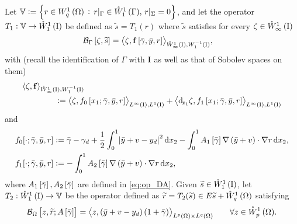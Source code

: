 \documentclass[final]{siamltex}
\begin{document}
Let ${\mathbb{V}} := \set{r \in {{W^{{1}}_{{q}}\del{{\Omega}}}}\,:\, r{\vert}_\Gamma \in {{\mathring{W}^{{1}}_{{1}}\del{{{\Gamma}}}}},\, r{\vert}_\Sigma = 0}$, 
and let the operator
$T_1:{\mathbb{V}} \to {{\mathring{W}^{1}_{1}\del{{\text{\rm I}}}}}$ be defined as ${\widetilde{s}} = T_1(r)$ where ${\widetilde{s}}$ satisfies for every $\zeta \in {{\mathring{W}^{1}_{\infty}\del{{\text{\rm I}}}}}$ 
\begin{align}\label{eq:t1_adj_var}
	{{\mathcal{B}}_\Gamma}\sbr{\zeta,{\widetilde{s}}} &= {\left\langle {\zeta, {\bf f}\sbr{{\bar{\gamma}},{\bar{y}},r}} \right\rangle}_{{{\mathring{W}^{{1}}_{{\infty}}\del{{\text{\rm I}}}}},
	{{W^{{-1}}_{{1}}\del{\text{\rm I}}}}},
\end{align}
with 
(recall the identification of $\Gamma$ with ${\text{\rm I}}$ as well as that 
of Sobolev spaces on them)
	\begin{align*}
	     &{\left\langle {\zeta,\bf f} \right\rangle}_{{{\mathring{W}^{1}_{\infty}\del{{\text{\rm I}}}}},{{W^{{-1}}_{{1}}\del{\text{\rm I}}}}} \\
	     &  \quad\quad\quad\quad := {\left\langle {\zeta, f_0\sbr{x_1;{\bar{\gamma}},{\bar{y}},r}} \right\rangle}_{{{L^\infty\del{{\text{\rm I}}}}}, {{L^1\del{\text{\rm I}}}}} 
				+ {\left\langle {{\operatorname{d}\!}_{x_1}\zeta,f_1\sbr{x_1;{\bar{\gamma}},{\bar{y}},r}} \right\rangle}_{{{L^\infty\del{{\text{\rm I}}}}},{{L^1\del{\text{\rm I}}}}}  
	\end{align*}			
and			
\begin{align}	
    	f_0[\cdot;{\bar{\gamma}}, {\bar{y}}, r] &:=  {\bar{\gamma}} - \gamma_d +
    	 \frac{1}{2}\int_0^1\abs{{\bar{y}}+v-y_d}^2 \dif x_2 
    	 - \int_0^1 A_1\sbr{\bar{\gamma}} {\nabla} \del{{\bar{y}}+v} \cdot {\nabla} r\dif x_2, \nonumber \\
    	f_1[\cdot;{\bar{\gamma}}, {\bar{y}}, r] &:=  - \int_0^1 A_2\sbr{\bar{\gamma}} {\nabla} \del{{\bar{y}}+v} \cdot {\nabla} r\dif x_2 	\label{eq:f0_f1_adj},
	\end{align}
where $A_1\sbr{\bar{\gamma}},A_2\sbr{\bar{\gamma}}$ are defined in \eqref{eq:op_DA}. 
Given ${\widetilde{s}} \in {{\mathring{W}^{1}_{1}\del{{\text{\rm I}}}}}$, let $T_2:{{\mathring{W}^{1}_{1}\del{{\text{\rm I}}}}} \to {\mathbb{V}}$ 
be the operator defined as 
${\widetilde{r}} = T_2({\widetilde{s}}) \in E {\widetilde{s}} + {{\mathring{W}^{1}_{q}\del{\Omega}}}$ satisfying
\begin{equation}\label{eq:t2_adj_var}
	{{\mathcal{B}}_\Omega}\sbr{z,{\widetilde{r}};A\sbr{\bar{\gamma}}} =  {{\mathop{{\left\langle {{z,\del{{\bar{y}} +v - y_d}
          \del{1+{\bar{\gamma}}}}} \right\rangle}}}_{{L^{p}\del{{\Omega}}}\times{L^{q}\del{{\Omega}}}}}  
	  \qquad \forall z \in {{\mathring{W}^{{1}}_{{p}}\del{{\Omega}}}} .
\end{equation}
\end{document}
